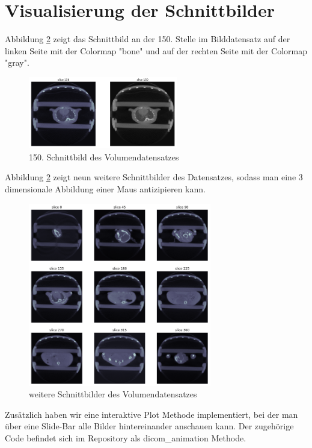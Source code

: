 \documentclass[conference]{IEEEtran}
\begin{document}
\section{Visualisierung der Schnittbilder}
Abbildung \ref{slices} zeigt das Schnittbild an der 150. Stelle im Bilddatensatz auf der linken Seite mit der Colormap "bone" und auf der rechten Seite mit der Colormap "gray".

\begin{figure}[H]
	\begin{center}
		\includegraphics[width=6.5cm]{latex/images/slice_150.png}
	 	\caption{150. Schnittbild des Volumendatensatzes}
	 	\label{slice_150}
	\end{center}
\end{figure}

Abbildung \ref{slices} zeigt neun weitere Schnittbilder des Datensatzes, sodass man eine 3 dimensionale Abbildung einer Maus antizipieren kann.

\begin{figure}[H]
	\begin{center}
		\includegraphics[width=8cm]{latex/images/slices.png}
	 	\caption{weitere Schnittbilder des Volumendatensatzes}
	 	\label{slices}
	\end{center}
\end{figure}

Zusätzlich haben wir eine interaktive Plot Methode implementiert, bei der man über eine Slide-Bar alle Bilder hintereinander anschauen kann. Der zugehörige Code befindet sich im Repository als dicom\_animation Methode.
\end{document}
